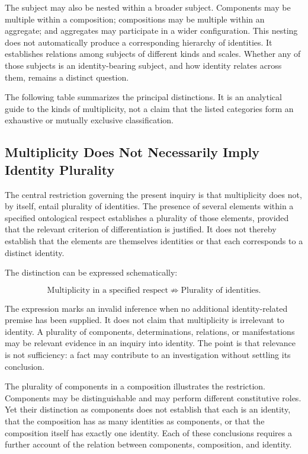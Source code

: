 The subject may also be nested within a broader subject. Components
may be multiple within a composition; compositions may be multiple
within an aggregate; and aggregates may participate in a wider
configuration. This nesting does not automatically produce a
corresponding hierarchy of identities. It establishes relations
among subjects of different kinds and scales. Whether any of those
subjects is an identity-bearing subject, and how identity relates
across them, remains a distinct question.

The following table summarizes the principal distinctions. It is
an analytical guide to the kinds of multiplicity, not a claim that
the listed categories form an exhaustive or mutually exclusive
classification.



\subsection{Multiplicity Does Not Necessarily Imply Identity Plurality}

The central restriction governing the present inquiry is that
multiplicity does not, by itself, entail plurality of identities.
The presence of several elements within a specified ontological
respect establishes a plurality of those elements, provided that
the relevant criterion of differentiation is justified. It does not
thereby establish that the elements are themselves identities or
that each corresponds to a distinct identity.

The distinction can be expressed schematically:

\[
\text{Multiplicity in a specified respect}
\not\Rightarrow
\text{Plurality of identities}.
\]

The expression marks an invalid inference when no additional
identity-related premise has been supplied. It does not claim that
multiplicity is irrelevant to identity. A plurality of components,
determinations, relations, or manifestations may be relevant evidence
in an inquiry into identity. The point is that relevance is not
sufficiency: a fact may contribute to an investigation without
settling its conclusion.

The plurality of components in a composition illustrates the
restriction. Components may be distinguishable and may perform
different constitutive roles. Yet their distinction as components
does not establish that each is an identity, that the composition
has as many identities as components, or that the composition
itself has exactly one identity. Each of these conclusions requires
a further account of the relation between components, composition,
and identity.

